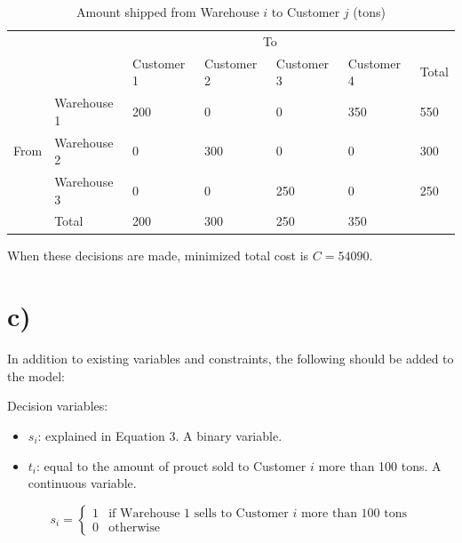 \documentclass{article}
\begin{document}
\begin{table}[ht]
    \caption{Amount shipped from Warehouse $i$ to Customer $j$ (tons)}
    \begin{tabular}{ll|lllll}
    \cline{3-6}
                               &             & \multicolumn{4}{c|}{To}                                                                                                                                            \\ \cline{2-7} 
    \multicolumn{1}{l|}{}      &             & \multicolumn{1}{l|}{Customer 1} & \multicolumn{1}{l|}{Customer 2} & \multicolumn{1}{l|}{Customer 3} & \multicolumn{1}{l|}{Customer 4} & \multicolumn{1}{l|}{Total} \\ \hline
    \multicolumn{1}{|l|}{}     & Warehouse 1 & \multicolumn{1}{l|}{200}        & \multicolumn{1}{l|}{0}          & \multicolumn{1}{l|}{0}          & \multicolumn{1}{l|}{350}        & \multicolumn{1}{l|}{550}   \\ \cline{2-7} 
    \multicolumn{1}{|l|}{From} & Warehouse 2 & \multicolumn{1}{l|}{0}          & \multicolumn{1}{l|}{300}        & \multicolumn{1}{l|}{0}          & \multicolumn{1}{l|}{0}          & \multicolumn{1}{l|}{300}   \\ \cline{2-7} 
    \multicolumn{1}{|l|}{}     & Warehouse 3 & \multicolumn{1}{l|}{0}          & \multicolumn{1}{l|}{0}          & \multicolumn{1}{l|}{250}        & \multicolumn{1}{l|}{0}          & \multicolumn{1}{l|}{250}   \\ \hline
    \multicolumn{1}{l|}{}      & Total       & \multicolumn{1}{l|}{200}        & \multicolumn{1}{l|}{300}        & \multicolumn{1}{l|}{250}        & \multicolumn{1}{l|}{350}        &                            \\ \cline{2-6}
    \end{tabular}
\end{table}

When these decisions are made, minimized total cost is $C = 54090$.

\section*{c)}
In addition to existing variables and constraints, the following should be added to the model:

Decision variables:
\begin{itemize}
    \item $s_i$: explained in Equation 3. A binary variable.
    \item $t_i$: equal to the amount of prouct sold to Customer $i$ more than 100 tons. A continuous variable.
\end{itemize}
\begin{equation}
    s_i = \begin{cases}
        1 & \text{if Warehouse $1$ sells to Customer $i$ more than 100 tons} \\
        0 & \text{otherwise}
    \end{cases}
\end{equation}
\end{document}
